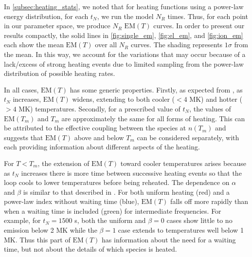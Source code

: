 \documentclass[preprint,linenumbers]{aastex}
\begin{document}
	\par In \autoref{subsec:heating_stats}, we noted that for heating functions using a power-law energy distribution, for each $t_N$, we run the model $N_R$ times. Thus, for each point in our parameter space, we produce $N_R$ $\mathrm{EM}(T)$ curves. In order to present our results compactly, the solid lines in \autoref{fig:single_em}, \autoref{fig:el_em}, and \autoref{fig:ion_em} each show the mean $\mathrm{EM}(T)$ over all $N_R$ curves. The shading represents $1\sigma$ from the mean. In this way, we account for the variations that may occur because of a lack/excess of strong heating events due to limited sampling from the power-law distribution of possible heating rates.
	\par In all cases, $\mathrm{EM}(T)$ has some generic properties. Firstly, as expected from \citet{cargill_active_2014}, as $t_N$ increases, $\mathrm{EM}(T)$ widens, extending to both cooler ($<4$ MK) and hotter ($>4$ MK) temperatures. Secondly, for a prescribed value of $t_N$, the values of $\mathrm{EM}(T_m)$ and $T_m$ are approximately the same for all forms of heating. This can be attributed to the effective coupling between the species at $n(T_m)$ and suggests that $\mathrm{EM}(T)$ above and below $T_m$ can be considered separately, with each providing information about different aspects of the heating.
	\par For $T<T_m$, the extension of $\mathrm{EM}(T)$ toward cooler temperatures arises because as $t_N$ increases there is more time between successive heating events so that the loop cools to lower temperatures before being reheated. The dependence on $\alpha$ and $\beta$ is similar to that described in \citet{cargill_active_2014}. For both uniform heating (red) and a power-law index without waiting time (blue), $\mathrm{EM}(T)$ falls off more rapidly than when a waiting time is included (green) for intermediate frequencies. For example, for $t_N=1500$ s, both the uniform and $\beta=0$ cases show little to no emission below 2 MK while the $\beta=1$ case extends to temperatures well below 1 MK. Thus this part of $\mathrm{EM}(T)$ has information about the need for a waiting time, but not about the details of which species is heated.
\end{document}
